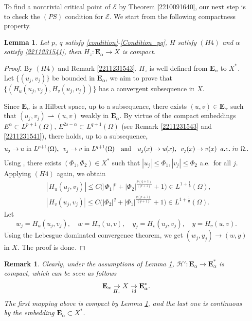 \documentclass[10pt]{article}
\numberwithin{equation}{section}
\newtheorem{lemma}[theorem]{Lemma}
\newtheorem{remark}[theorem]{Remark}
\numberwithin{equation}{section}
\begin{document}
To find a nontrivial critical point of $\mathcal{E}$ by Theorem \ref{2210091640}, our next step is to check the $(PS)$ condition for $\mathcal{E}$. We start from the following compactness property.
\begin{lemma}\label{2211151517}
Let $p$, $q$ satisfy \eqref{condition}-\eqref{Condition_pq}, ${H}$ satisfy $(H4)$ and $\alpha$ satisfy \eqref{2211231541}, then $H_z: \mathbf{E}_{\alpha}\to X$ is compact.
\end{lemma}
\begin{proof}
By $(H4)$ and Remark \ref{2211231543}, $H_z$ is well defined from $\mathbf{E}_{\alpha}$ to $X^*$. Let $\{(u_j, v_j)\}$ be bounded in $\mathbf{E}_{\alpha}$, we aim to prove that $\{(H_u(u_j, v_j), H_v(u_j, v_j))\}$ has a convergent subsequence in $X$.

Since $\mathbf{E}_{\alpha}$ is a Hilbert space, up to a subsequence, there exists $(u, v)\in \mathbf{E}_{\alpha}$ such that
$(u_j, v_j) \rightharpoonup (u, v)$ weakly in $\mathbf{E}_{\alpha}$. By virtue of the compact embeddings $E^\alpha\subset L^{p+1}(\Omega)$, $E^{2s-\alpha}\subset L^{q+1}(\Omega)$ (see Remark \ref{2211231543} and \eqref{2211231541}), there holds, up to a subsequence,
\[
u_j\to u ~\text{in}~L^{p+1}(\Omega), \;\; v_j\to v ~\text{in}~L^{q+1}(\Omega)  \quad\mbox{and}\quad u_j(x)\to u(x),\;\; v_j(x)\to v(x)\;\; {\rm a.e.~in }~\Omega..
\]
Using \cite[Theorem 4.9]{Brezis2010}, there exists $(\Phi_1, \Phi_2)\in X^*$ such that $|u_j|\le \Phi_1, |v_j|\le \Phi_2$ a.e.~for all $j$. Applying $(H4)$ again, we obtain
\[
\begin{aligned}
&|H_u(u_j, v_j)|\le C\big(| \Phi_1|^p+| \Phi_2|^\frac{p(q+1)}{(p+1)}+1\big)\in L^{1+\frac1p}(\Omega),\\
&|H_v(u_j, v_j)|\le C\big(| \Phi_2|^q+| \Phi_1|^\frac{q(p+1)}{(q+1)}+1\big)\in L^{1+\frac1q}(\Omega).
\end{aligned}
\]
Let
\[
w_j=H_u(u_j, v_j),\quad w=H_u(u, v),\quad y_j=H_v(u_j, v_j),\quad y=H_v(u, v).
\]
Using the Lebesgue dominated convergence theorem, we get $(w_j, y_j)\to (w, y)$ in $X$. The proof is done.
\end{proof}
\begin{remark}\label{2302211335}
Clearly,  under the assumptions of Lemma \ref{2211151517}, $\mathcal{H}': \mathbf{E}_{\alpha}\to \mathbf{E}_{\alpha}^*$ is compact, which can be seen as follows
\[
\mathbf{E}_{\alpha}\underset{H_z}{\to} X\underset{\rm id}{\to} \mathbf{E}_{\alpha}^*.
\]
The first mapping above is compact by Lemma \ref{2211151517}, and the last one is continuous by the embedding $\mathbf{E}_{\alpha}\subset X^*$.
\end{remark}
\end{document}
